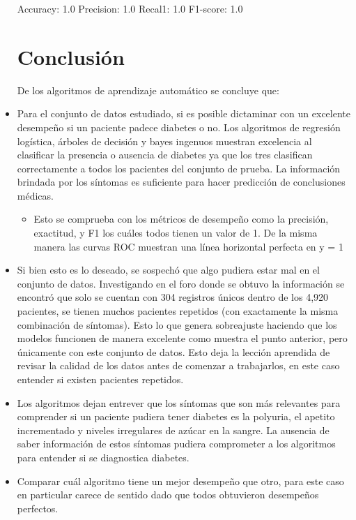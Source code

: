 \documentclass[twocolumn]{bmcart}%
\begin{document}
\begin{itemize}
Accuracy: 1.0
Precision: 1.0
Recal1: 1.0
F1-score: 1.0


\section*{Conclusión}

De los algoritmos de aprendizaje automático se concluye que:  
\item Para el conjunto de datos estudiado, si es posible dictaminar con un excelente desempeño si un paciente padece diabetes o no. Los algoritmos de regresión logística, árboles de decisión y bayes ingenuos muestran excelencia al clasificar la presencia o ausencia de diabetes ya que los tres clasifican correctamente a todos los pacientes del conjunto de prueba. La información brindada por los síntomas es suficiente para hacer predicción de conclusiones médicas. 
\begin{itemize}
    \item Esto se comprueba con los métricos de desempeño como la precisión, exactitud, y F1 los cuáles todos tienen un valor de 1. De la misma manera las curvas ROC muestran una línea horizontal perfecta en y = 1 
\end{itemize}

\item Si bien esto es lo deseado, se sospechó que algo pudiera estar mal en el conjunto de datos. Investigando en el foro donde se obtuvo la información se encontró que solo se cuentan con 304 registros únicos dentro de los 4,920 pacientes, se tienen muchos pacientes repetidos (con exactamente la misma combinación de síntomas). Esto lo que genera sobreajuste haciendo que los modelos funcionen de manera excelente como muestra el punto anterior, pero únicamente con este conjunto de datos. Esto deja la lección aprendida de revisar la calidad de los datos antes de comenzar a trabajarlos, en este caso entender si existen pacientes repetidos.  


\item Los algoritmos dejan entrever que los síntomas que son más relevantes para comprender si un paciente pudiera tener diabetes es la polyuria, el apetito incrementado y niveles irregulares de azúcar en la sangre. La ausencia de saber información de estos síntomas pudiera comprometer a los algoritmos para entender si se diagnostica diabetes. 

\item Comparar cuál algoritmo tiene un mejor desempeño que otro, para este caso en particular carece de sentido dado que todos obtuvieron desempeños perfectos. 


\end{itemize}
\end{document}
